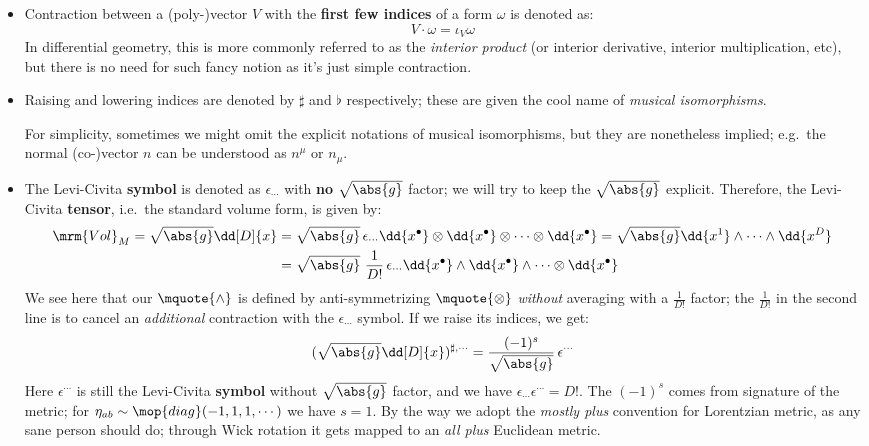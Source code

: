 \documentclass[a4paper
	,10pt
]{article}
\begin{document}
	\begin{itemize}
	\item Contraction between a (poly-)vector $V$ with the \textbf{first few indices} of a form $\omega$ is denoted as:
	\begin{equation}
		V\cdot \omega = \iota_V \omega
	\end{equation}
	In differential geometry, this is more commonly referred to as the \textit{interior product} (or interior derivative, interior multiplication, etc), but there is no need for such fancy notion as it's just simple contraction. 
	
	\item Raising and lowering indices are denoted by $\sharp$ and $\flat$ respectively; these are given the cool name of \textit{musical isomorphisms}. 
	
	For simplicity, sometimes we might omit the explicit notations of musical isomorphisms, but they are nonetheless implied; e.g.~the normal (co-)vector $n$ can be understood as $n^\mu$ or $n_\mu$. 
	
	\item The Levi-Civita \textbf{symbol} is denoted as $\epsilon_{\cdots}$ with \textbf{no} $\sqrt{\abs{g}}$ factor; we will try to keep the $\sqrt{\abs{g}}$ explicit. Therefore, the Levi-Civita \textbf{tensor}, i.e.~the standard volume form, is given by:
	\begin{equation}
	\begin{aligned}
		\mrm{Vol}_M
		= \sqrt{\abs{g}} \dd[D]{x}
		&= \sqrt{\abs{g}}\, \epsilon_{\cdots}
			\dd{x^\bullet} \otimes
			\dd{x^\bullet} \otimes
			\cdots \otimes
			\dd{x^\bullet}
		= \sqrt{\abs{g}} \dd{x^1} \wedge
			\cdots \wedge \dd{x^D} \\
		&= \sqrt{\abs{g}}
			\ \frac{1}{D!}\,
			\epsilon_{\cdots}
			\dd{x^\bullet} \wedge
			\dd{x^\bullet} \wedge
			\cdots \otimes
			\dd{x^\bullet}
	\end{aligned}
	\end{equation}
	We see here that our $\mquote{\wedge}$ is defined by anti-symmetrizing $\mquote{\otimes}$ \textit{without} averaging with a $\frac{1}{D!}$ factor; the $\frac{1}{D!}$ in the second line is to cancel an \textit{additional} contraction with the $\epsilon_{\cdots}$ symbol. 
	If we raise its indices, we get:
	\begin{equation}
		(\sqrt{\abs{g}} \dd[D]{x})^{\sharp,\cdots}
		= \frac{(-1)^s}{\sqrt{\abs{g}}}\,
			\epsilon^{\cdots}
	\end{equation}
	Here $\epsilon^{\cdots}$ is still the Levi-Civita \textbf{symbol} without $\sqrt{\abs{g}}$ factor, and we have $\epsilon_{\cdots} \epsilon^{\cdots} = D!$. The $(-1)^s$ comes from signature of the metric; for $
		\eta_{ab} \sim \mop{diag}(-1,1,1,\cdots)
	$ we have $s = 1$. By the way we adopt the \textit{mostly plus} convention for Lorentzian metric, as any sane person should do; through Wick rotation it gets mapped to an \textit{all plus} Euclidean metric. 
	

\end{itemize}
\end{document}
